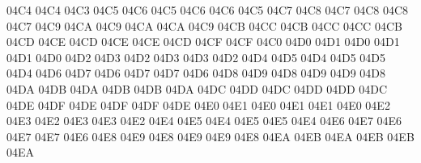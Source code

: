 \setcclcucx 04C4 04C4 04C3 %
\setcclcucx 04C5 04C6 04C5 %
\setcclcucx 04C6 04C6 04C5 %
\setcclcucx 04C7 04C8 04C7 %
\setcclcucx 04C8 04C8 04C7 %
\setcclcucx 04C9 04CA 04C9 %
\setcclcucx 04CA 04CA 04C9 %
\setcclcucx 04CB 04CC 04CB %
\setcclcucx 04CC 04CC 04CB %
\setcclcucx 04CD 04CE 04CD %
\setcclcucx 04CE 04CE 04CD %
\setcclcucx 04CF 04CF 04C0 %
\setcclcucx 04D0 04D1 04D0 %
\setcclcucx 04D1 04D1 04D0 %
\setcclcucx 04D2 04D3 04D2 %
\setcclcucx 04D3 04D3 04D2 %
\setcclcucx 04D4 04D5 04D4 %
\setcclcucx 04D5 04D5 04D4 %
\setcclcucx 04D6 04D7 04D6 %
\setcclcucx 04D7 04D7 04D6 %
\setcclcucx 04D8 04D9 04D8 %
\setcclcucx 04D9 04D9 04D8 %
\setcclcucx 04DA 04DB 04DA %
\setcclcucx 04DB 04DB 04DA %
\setcclcucx 04DC 04DD 04DC %
\setcclcucx 04DD 04DD 04DC %
\setcclcucx 04DE 04DF 04DE %
\setcclcucx 04DF 04DF 04DE %
\setcclcucx 04E0 04E1 04E0 %
\setcclcucx 04E1 04E1 04E0 %
\setcclcucx 04E2 04E3 04E2 %
\setcclcucx 04E3 04E3 04E2 %
\setcclcucx 04E4 04E5 04E4 %
\setcclcucx 04E5 04E5 04E4 %
\setcclcucx 04E6 04E7 04E6 %
\setcclcucx 04E7 04E7 04E6 %
\setcclcucx 04E8 04E9 04E8 %
\setcclcucx 04E9 04E9 04E8 %
\setcclcucx 04EA 04EB 04EA %
\setcclcucx 04EB 04EB 04EA %
